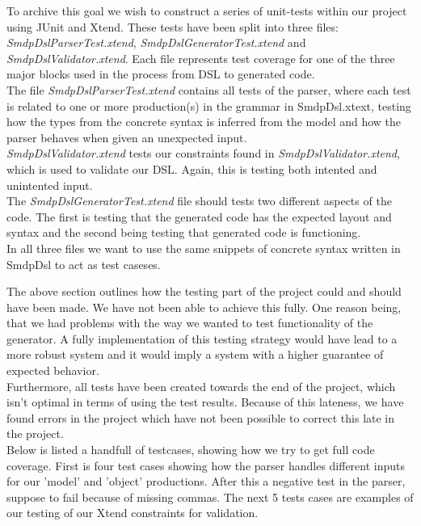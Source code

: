 \documentclass[paper=a4, fontsize=11pt]{scrartcl} %
\numberwithin{equation}{section} %
\numberwithin{figure}{section} %
\numberwithin{table}{section} %
\begin{document}
To archive this goal we wish to construct a series of unit-tests within our project using JUnit and Xtend. These tests have been split into three files: \textit{SmdpDslParserTest.xtend}, \textit{SmdpDslGeneratorTest.xtend} and \textit{SmdpDslValidator.xtend}. Each file represents test coverage for one of the three major blocks used in the process from DSL to generated code.\\
The file \textit{SmdpDslParserTest.xtend} contains all tests of the parser, where each test is related to one or more production(s) in the grammar in SmdpDsl.xtext, testing how the types from the concrete syntax is inferred from the model and how the parser behaves when given an unexpected input.\\ 
\textit{SmdpDslValidator.xtend} tests our constraints found in \textit{SmdpDslValidator.xtend}, which is used to validate our DSL. Again, this is testing both intented and unintented input.\\ 
The \textit{SmdpDslGeneratorTest.xtend} file should tests two different aspects of the code. The first is testing that the generated code has the expected layout and syntax and the second being testing that generated code is functioning. \\
In all three files we want to use the same snippets of concrete syntax written in SmdpDsl to act as test caseses.\newline

The above section outlines how the testing part of the project could and should have been made. We have not been able to achieve this fully. One reason being, that we had problems with the way we wanted to test functionality of the generator. A fully implementation of this testing strategy would have lead to a more robust system and it would imply a system with a higher guarantee of expected behavior. \\
Furthermore, all tests have been created towards the end of the project, which isn't optimal in terms of using the test results. Because of this lateness, we have found errors in the project which have not been possible to correct this late in the project.\\

Below is listed a handfull of testcases, showing how we try to get full code coverage. First is four test cases showing how the parser handles different inputs for our 'model' and 'object' productions. After this a negative test in the parser, suppose to fail because of missing commas. The next 5 tests cases are examples of our testing of our Xtend constraints for validation.  
\end{document}
